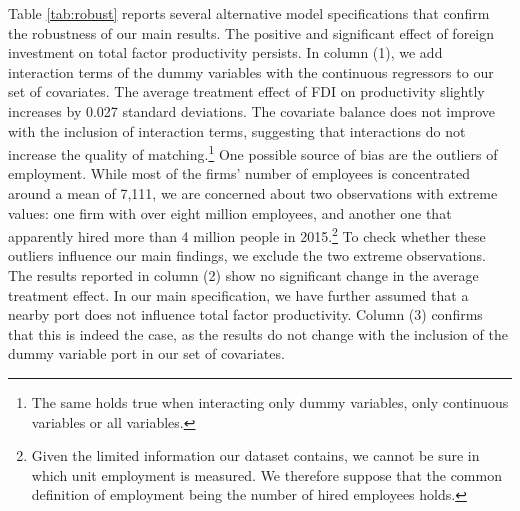 \documentclass[a4paper,11pt]{scrartcl}
\begin{document}
Table \ref{tab:robust} reports several alternative model specifications that confirm the robustness of our main results. The positive and significant effect of foreign investment on total factor productivity persists. In column (1), we add interaction terms of the dummy variables with the continuous regressors to our set of covariates. The average treatment effect of FDI on productivity slightly increases by 0.027 standard deviations. The covariate balance does not improve with the inclusion of interaction terms, suggesting that interactions do not increase the quality of matching.\footnote{The same holds true when interacting only dummy variables, only continuous variables or all variables.} One possible source of bias are the outliers of employment. While most of the firms' number of employees is concentrated around a mean of 7,111, we are concerned about two observations with extreme values: one firm with over eight million employees, and another one that apparently hired more than 4 million people in 2015.\footnote{Given the limited information our dataset contains, we cannot be sure in which unit employment is measured. We therefore suppose that the common definition of employment being the number of hired employees holds.}  To check whether these outliers influence our main findings, we exclude the two extreme observations. The results reported in column (2) show no significant change in the average treatment effect. %
In our main specification, we have further assumed that a nearby port does not influence total factor productivity. Column (3) confirms that this is indeed the case, as the results do not change with the inclusion of the dummy variable port in our set of covariates. 
\end{document}
